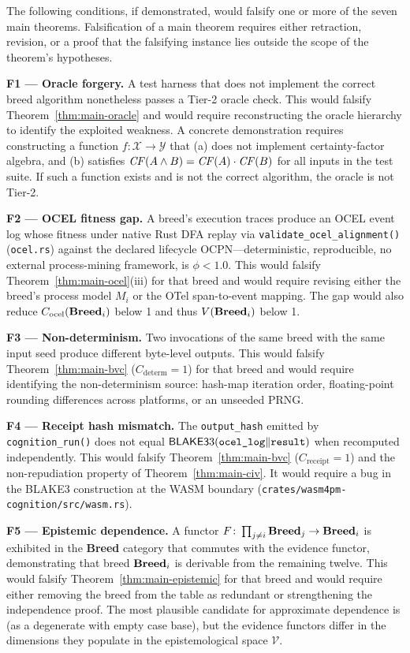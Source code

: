 The following conditions, if demonstrated, would falsify one or more of the seven main
theorems. Falsification of a main theorem requires either retraction, revision, or a proof
that the falsifying instance lies outside the scope of the theorem's hypotheses.

\medskip
\textbf{F1 — Oracle forgery.} A test harness that does not implement the correct
breed algorithm nonetheless passes a Tier-2 oracle check. This would falsify
Theorem~\ref{thm:main-oracle} and would require reconstructing the oracle hierarchy
to identify the exploited weakness. A concrete demonstration requires constructing a
function $f \colon \mathcal{X} \to \mathcal{Y}$ that (a) does not implement \MYCIN{}
certainty-factor algebra, and (b) satisfies $\mathit{CF}(A \wedge B) = \mathit{CF}(A) \cdot \mathit{CF}(B)$
for all inputs in the test suite. If such a function exists and is not the correct
algorithm, the oracle is not Tier-2.

\medskip
\textbf{F2 — OCEL fitness gap.} A breed's execution traces produce an OCEL event log
whose fitness under native Rust DFA replay via \texttt{validate\_ocel\_alignment()} (\texttt{ocel.rs}) against the declared lifecycle OCPN---deterministic, reproducible, no external process-mining framework, is $\phi < 1.0$. This would falsify
Theorem~\ref{thm:main-ocel}(iii) for that breed and would require revising either the
breed's process model $M_i$ or the OTel span-to-event mapping. The gap would also
reduce $C_{\mathrm{ocel}}(\mathbf{Breed}_i)$ below 1 and thus $V(\mathbf{Breed}_i)$ below 1.

\medskip
\textbf{F3 — Non-determinism.} Two invocations of the same breed with the same input
seed produce different byte-level outputs. This would falsify
Theorem~\ref{thm:main-bvc} ($C_{\mathrm{determ}} = 1$) for that breed and would
require identifying the non-determinism source: hash-map iteration order, floating-point
rounding differences across platforms, or an unseeded PRNG.

\medskip
\textbf{F4 — Receipt hash mismatch.} The \texttt{output\_hash} emitted by
\texttt{cognition\_run()} does not equal
$\mathsf{BLAKE3}3(\texttt{ocel\_log} \Vert \texttt{result})$ when recomputed independently.
This would falsify Theorem~\ref{thm:main-bvc} ($C_{\mathrm{receipt}} = 1$) and the
non-repudiation property of Theorem~\ref{thm:main-civ}. It would require a bug in
the BLAKE3 construction at the WASM boundary
(\texttt{crates/wasm4pm-cognition/src/wasm.rs}).

\medskip
\textbf{F5 — Epistemic dependence.} A functor $F \colon \prod_{j \neq i} \mathbf{Breed}_j
\to \mathbf{Breed}_i$ is exhibited in the \textbf{Breed} category that commutes with the
evidence functor, demonstrating that breed $\mathbf{Breed}_i$ is derivable from the remaining
twelve. This would falsify Theorem~\ref{thm:main-epistemic} for that breed and would
require either removing the breed from the table as redundant or strengthening the
independence proof. The most plausible candidate for approximate dependence is \ELIZA{}
(as a degenerate \CBR{} with empty case base), but the evidence functors differ in the
dimensions they populate in the epistemological space $\mathcal{V}$.

